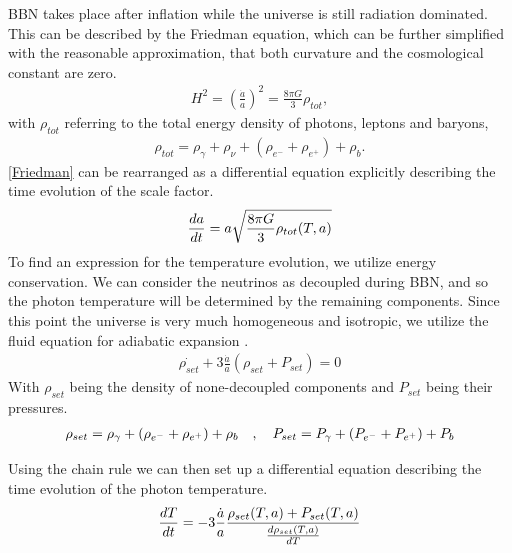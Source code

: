 BBN takes place after inflation while the universe is still radiation dominated. This can be described by the Friedman equation, which can be further simplified with the reasonable approximation, that both curvature and the cosmological constant are zero. 
\begin{align}
    H^2=\left(\frac{\dot{a}}{a}\right)^2=\frac{8\pi G}{3}\rho_{tot},
    \label{Friedman}
\end{align}
with $\rho_{tot}$ referring to the total energy density of photons, leptons and baryons,
\begin{align}
    \rho_{tot}=\rho_{\gamma}+\rho_{\nu}+(\rho_{e^-}+\rho_{e^+})+\rho_{b}.
\end{align}
\eqref{Friedman} can be rearranged as a differential equation explicitly describing the time evolution of the scale factor.
\begin{align}
    \frac{da}{dt}=a\sqrt{\frac{8\pi G}{3}\rho_{tot}(T,a)}
    \label{eq:dadt}
\end{align}
To find an expression for the temperature evolution, we utilize energy conservation. We can consider the neutrinos as decoupled during BBN, and so the photon temperature will be determined by the remaining components. Since this point the universe is very much homogeneous and isotropic, we utilize the fluid equation for adiabatic expansion \cite[{(4.44)}]{Ryden}. 
\begin{align}
    \dot{\rho_{set}}+3\frac{\dot{a}}{a}(\rho_{set} + P_{set})=0
\end{align}
With $\rho_{set}$ being the density of none-decoupled components and $P_{set}$ being their pressures.
\begin{align}
    \rho_{set}=\rho_{\gamma}+(\rho_{e^-}+\rho_{e^+})+\rho_{b}
    \quad , \quad P_{set}=P_{\gamma}+(P_{e^-}+P_{e^+})+P_{b}
\end{align}

Using the chain rule we can then set up a differential equation describing the time evolution of the photon temperature. 
\begin{align}
    \frac{dT}{dt}=-3\frac{\dot{a}}{a}\frac{\rho_{set}(T,a) + P_{set}(T,a)}{\frac{d\rho_{set}(T,a)}{dT}}
    \label{eq:dTdt}
\end{align}

